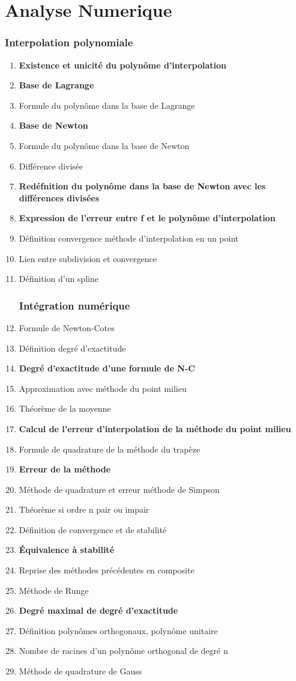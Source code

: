 \documentclass{article}
\begin{document}
\setcounter{tocdepth}{4}
\tableofcontents
\newpage

\part{Analyse Numerique}
\section{Interpolation polynomiale}
\begin{enumerate}
\item \textbf{Existence et unicité du polynôme d'interpolation}
\item \textbf{Base de Lagrange}
\item Formule du polynôme dans la base de Lagrange
\item \textbf{Base de Newton}
\item Formule du polynôme dans la base de Newton
\item Différence divisée
\item \textbf{Redéfnition du polynôme dans la base de Newton avec les différences divisées}
\item \textbf{Expression de l'erreur entre f et le polynôme d'interpolation}
\item Définition convergence méthode d'interpolation en un point
\item Lien entre subdivision et convergence
\item Définition d'un spline

\section{Intégration numérique}
\item Formule de Newton-Cotes
\item Définition degré d'exactitude
\item \textbf{Degré d'exactitude d'une formule de N-C}
\item Approximation avec méthode du point milieu
\item Théorème de la moyenne
\item \textbf{Calcul de l'erreur d'interpolation de la méthode du point milieu}
\item Formule de quadrature de la méthode du trapèze
\item \textbf{Erreur de la méthode}
\item Méthode de quadrature et erreur méthode de Simpson
\item Théorème si ordre n pair ou impair
\item Définition de convergence et de stabilité
\item \textbf{Équivalence à stabilité}
\item Reprise des méthodes précédentes en composite
\item Méthode de Runge
\item \textbf{Degré maximal de degré d'exactitude}
\item Définition polynômes orthogonaux, polynôme unitaire
\item Nombre de racines d'un polynôme orthogonal de degré n
\item Méthode de quadrature de Gauss


\end{enumerate}
\end{document}
